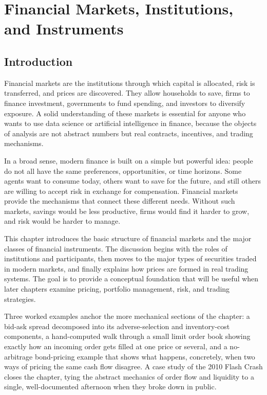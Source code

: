 \documentclass[../ai_in_finance]{subfiles}
\begin{document}
\chapter{Financial Markets, Institutions, and Instruments}

\section{Introduction}

Financial markets are the institutions through which capital is allocated, risk is transferred, and prices are discovered. They allow households to save, firms to finance investment, governments to fund spending, and investors to diversify exposure. A solid understanding of these markets is essential for anyone who wants to use data science or artificial intelligence in finance, because the objects of analysis are not abstract numbers but real contracts, incentives, and trading mechanisms.

In a broad sense, modern finance is built on a simple but powerful idea: people do not all have the same preferences, opportunities, or time horizons. Some agents want to consume today, others want to save for the future, and still others are willing to accept risk in exchange for compensation. Financial markets provide the mechanisms that connect these different needs. Without such markets, savings would be less productive, firms would find it harder to grow, and risk would be harder to manage.

This chapter introduces the basic structure of financial markets and the major classes of financial instruments. The discussion begins with the roles of institutions and participants, then moves to the major types of securities traded in modern markets, and finally explains how prices are formed in real trading systems. The goal is to provide a conceptual foundation that will be useful when later chapters examine pricing, portfolio management, risk, and trading strategies.

Three worked examples anchor the more mechanical sections of the chapter: a bid-ask spread decomposed into its adverse-selection and inventory-cost components, a hand-computed walk through a small limit order book showing exactly how an incoming order gets filled at one price or several, and a no-arbitrage bond-pricing example that shows what happens, concretely, when two ways of pricing the same cash flow disagree. A case study of the 2010 Flash Crash closes the chapter, tying the abstract mechanics of order flow and liquidity to a single, well-documented afternoon when they broke down in public.
\end{document}
